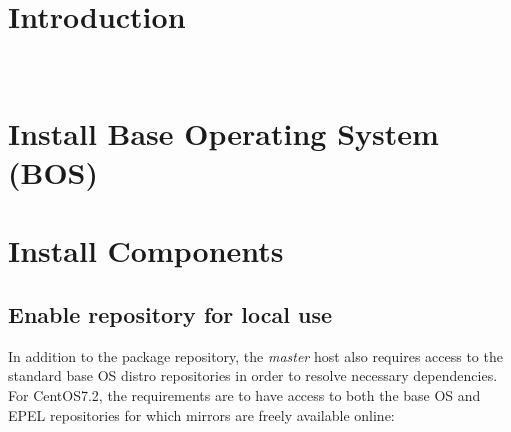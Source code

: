 \documentclass[letterpaper]{article}
\newcommand{\baseOS}{CentOS7.2}
\begin{document}
\graphicspath{{common/figures/}}
\thispagestyle{empty}


 

\newpage
\tableofcontents
\newpage


\section{Introduction} \label{sec:introduction}

 \\







\section{Install Base Operating System (BOS)}



\section{Install \OHPC{} Components} \label{sec:basic_install}


\subsection{Enable \OHPC{} repository for local use} \label{sec:enable_repo}



In addition to the \OHPC{} package repository, the {\em master} host also
requires access to the standard base OS distro repositories in order to resolve
necessary dependencies. For \baseOS{}, the requirements are to have access to
both the base OS and EPEL repositories for which mirrors are freely available online:
\end{document}
